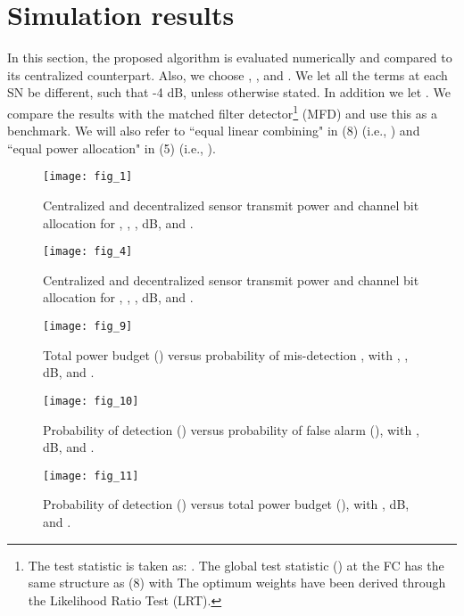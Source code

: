 \documentclass[conference]{IEEEtran}
\begin{document}
\section{Simulation results}
\label{SIMULATION RESULTS}
In this section, the proposed algorithm is evaluated numerically and compared to its centralized counterpart. Also, we choose , ,  and . We let all the   terms at each SN be different, such that  -4 dB, unless otherwise stated. In addition we let  . We compare the results with the matched filter detector\footnote{The test statistic is taken as: . The global test statistic () at the FC has the same structure as (8) with  The optimum weights have been derived through the Likelihood Ratio Test (LRT).} (MFD) and use this as a benchmark. We will also refer to ``equal linear combining" in (8) (i.e., ) and ``equal power allocation" in (5) (i.e., ).
\begin{figure}[!htp]
\centerline{\texttt{[image: fig\_1]}}
\caption[Centralized and decentralized sensor transmit power and channel bit allocation for , ,  and ]{\label{fig:fig_1}
Centralized and decentralized sensor transmit power and channel bit allocation for , , ,  dB,  and .}
\vspace{0.22cm}
\end{figure}
\begin{figure}[htp!]
\centerline{\texttt{[image: fig\_4]}}
\caption[Disagreement error versus time for  sensors.]{\label{fig:fig_4}
    Centralized and decentralized sensor transmit power and channel bit allocation for , , ,  dB,  and .}
\end{figure}
\begin{figure}[htp!]
\centerline{\texttt{[image: fig\_9]}}
\caption[Disagreement error versus time for  sensors.]{\label{fig:fig_9}
    Total power budget () versus probability of mis-detection , with , ,  dB,  and .}
\end{figure}
\begin{figure}[htp!]
\centerline{\texttt{[image: fig\_10]}}
\caption[Disagreement error versus time for  sensors.]{\label{fig:fig_10}
Probability of detection () versus probability of false alarm (), with ,  dB,  and .}
\end{figure}
\begin{figure}[htp!]
\centerline{\texttt{[image: fig\_11]}}
\caption[Disagreement error versus time for  sensors.]{\label{fig:fig_11}
 Probability of detection () versus total power budget (), with ,  dB,  and .}
\end{figure}
\end{document}
